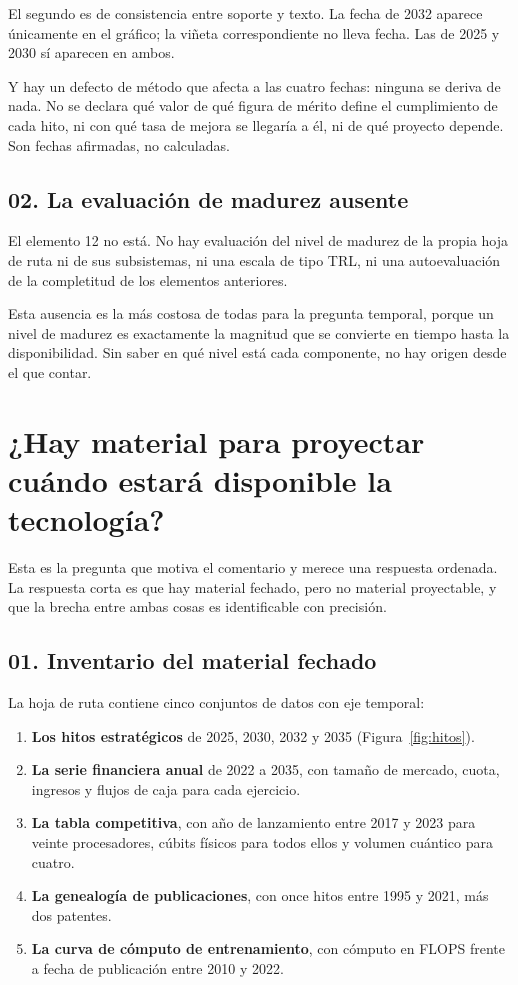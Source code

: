 \documentclass[11pt,letterpaper]{article}
\begin{document}
El segundo es de consistencia entre soporte y texto. La fecha de 2032 aparece
únicamente en el gráfico; la viñeta correspondiente no lleva fecha. Las de 2025
y 2030 sí aparecen en ambos.

Y hay un defecto de método que afecta a las cuatro fechas: ninguna se deriva de
nada. No se declara qué valor de qué figura de mérito define el cumplimiento de
cada hito, ni con qué tasa de mejora se llegaría a él, ni de qué proyecto
depende. Son fechas afirmadas, no calculadas.

\subsection*{02. La evaluación de madurez ausente}

El elemento 12 no está. No hay evaluación del nivel de madurez de la propia
hoja de ruta ni de sus subsistemas, ni una escala de tipo TRL, ni una
autoevaluación de la completitud de los elementos anteriores.

Esta ausencia es la más costosa de todas para la pregunta temporal, porque un
nivel de madurez es exactamente la magnitud que se convierte en tiempo hasta la
disponibilidad. Sin saber en qué nivel está cada componente, no hay origen
desde el que contar.

\section{¿Hay material para proyectar cuándo estará disponible la tecnología?}

Esta es la pregunta que motiva el comentario y merece una respuesta ordenada.
La respuesta corta es que hay material fechado, pero no material proyectable, y
que la brecha entre ambas cosas es identificable con precisión.

\subsection*{01. Inventario del material fechado}

La hoja de ruta contiene cinco conjuntos de datos con eje temporal:

\begin{enumerate}
  \item \textbf{Los hitos estratégicos} de 2025, 2030, 2032 y 2035
    (Figura~\ref{fig:hitos}).
  \item \textbf{La serie financiera anual} de 2022 a 2035, con tamaño de
    mercado, cuota, ingresos y flujos de caja para cada ejercicio.
  \item \textbf{La tabla competitiva}, con año de lanzamiento entre 2017 y 2023
    para veinte procesadores, cúbits físicos para todos ellos y volumen
    cuántico para cuatro.
  \item \textbf{La genealogía de publicaciones}, con once hitos entre 1995 y
    2021, más dos patentes.
  \item \textbf{La curva de cómputo de entrenamiento}, con cómputo en FLOPS
    frente a fecha de publicación entre 2010 y 2022.
\end{enumerate}
\end{document}

